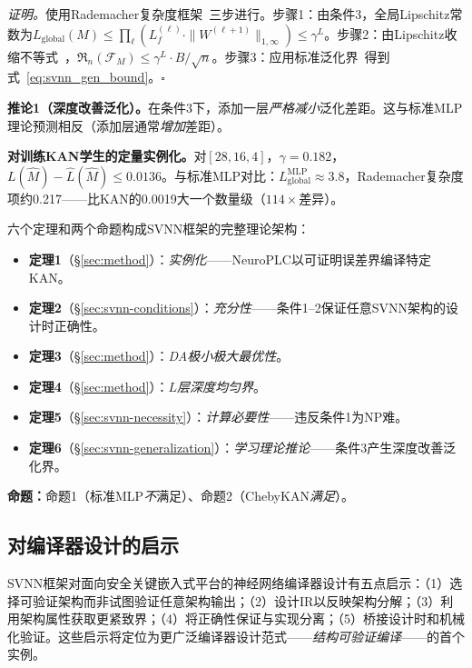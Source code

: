 \vspace{4pt}
\noindent\textit{证明。}使用Rademacher复杂度框架~\cite{bartlett2002rademacher}三步进行。步骤1：由条件3，全局Lipschitz常数为$L_{\text{global}}(M) \leq \prod_\ell (L_f^{(\ell)} \cdot \|W^{(\ell+1)}\|_{1,\infty}) \leq \gamma^L$。步骤2：由Lipschitz收缩不等式~\cite{bartlett2002rademacher}，$\mathfrak{R}_n(\mathcal{F}_M) \leq \gamma^L \cdot B/\sqrt{n}$。步骤3：应用标准泛化界~\cite{boucheron2013concentration}得到式~\ref{eq:svnn_gen_bound}。$\square$

\vspace{4pt}
\noindent\textbf{推论1（深度改善泛化）。}在条件3下，添加一层\textit{严格减小}泛化差距。这与标准MLP理论预测相反（添加层通常\textit{增加}差距）。

\textbf{对训练KAN学生的定量实例化。}对$[28,16,4]$，$\gamma=0.182$，$L(\hat{M})-\hat{L}(\hat{M}) \leq 0.0136$。与标准MLP对比：$L_{\text{global}}^{\text{MLP}} \approx 3.8$，Rademacher复杂度项约0.217——比KAN的0.0019大一个数量级（$114\times$差异）。

\vspace{4pt}
\begin{remark}[SVNN六大定理]
\label{rem:six_theorems}
六个定理和两个命题构成SVNN框架的完整理论架构：
\begin{itemize}
    \item \textbf{定理1}（\S\ref{sec:method}）：\textit{实例化}——NeuroPLC以可证明误差界编译特定KAN。
    \item \textbf{定理2}（\S\ref{sec:svnn-conditions}）：\textit{充分性}——条件1--2保证任意SVNN架构的设计时正确性。
    \item \textbf{定理3}（\S\ref{sec:method}）：\textit{DA极小极大最优性}。
    \item \textbf{定理4}（\S\ref{sec:method}）：\textit{$L$层深度均匀界}。
    \item \textbf{定理5}（\S\ref{sec:svnn-necessity}）：\textit{计算必要性}——违反条件1为NP难。
    \item \textbf{定理6}（\S\ref{sec:svnn-generalization}）：\textit{学习理论推论}——条件3产生深度改善泛化界。
\end{itemize}
\textbf{命题：}命题1（标准MLP\textit{不}满足）、命题2（ChebyKAN\textit{满足}）。
\end{remark}

\subsection{对编译器设计的启示}
\label{sec:svnn-implications}

SVNN框架对面向安全关键嵌入式平台的神经网络编译器设计有五点启示：（1）选择可验证架构而非试图验证任意架构输出；（2）设计IR以反映架构分解；（3）利用架构属性获取更紧致界；（4）将正确性保证与实现分离；（5）桥接设计时和机械化验证。这些启示将\neuroplc{}定位为更广泛编译器设计范式——\textit{结构可验证编译}——的首个实例。

